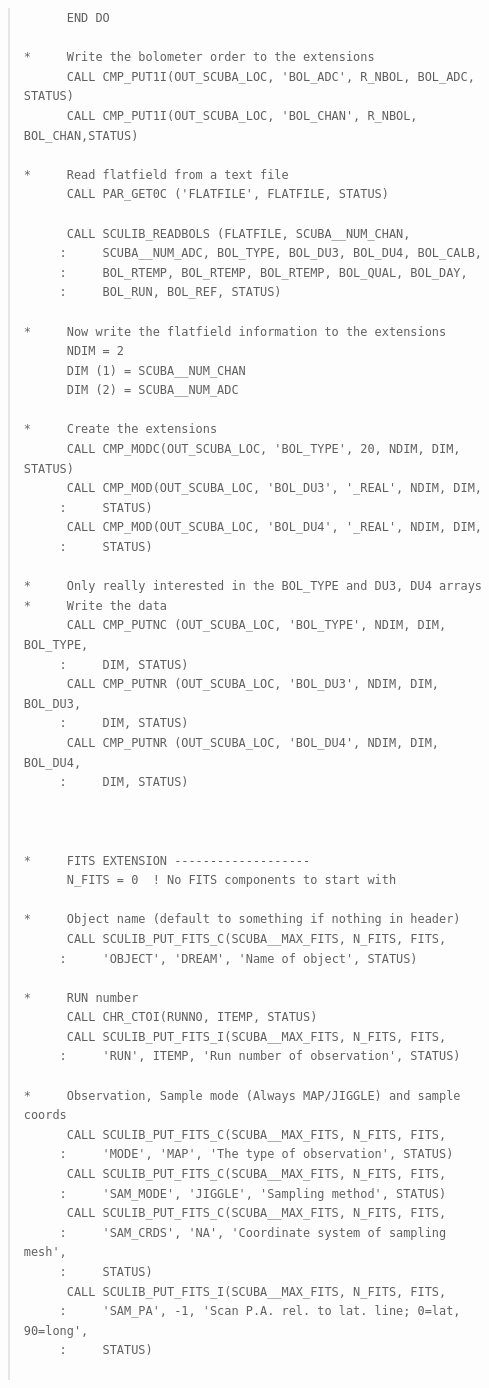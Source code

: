\documentclass[twoside,11pt]{article}
\newenvironment{myquote}{\begin{quote}\begin{small}}{\end{small}\end{quote}}
\renewcommand{\_}{\texttt{\symbol{95}}}
\begin{document}
\begin{myquote}
\begin{verbatim}
      END DO

*     Write the bolometer order to the extensions
      CALL CMP_PUT1I(OUT_SCUBA_LOC, 'BOL_ADC', R_NBOL, BOL_ADC, STATUS)
      CALL CMP_PUT1I(OUT_SCUBA_LOC, 'BOL_CHAN', R_NBOL, BOL_CHAN,STATUS)

*     Read flatfield from a text file
      CALL PAR_GET0C ('FLATFILE', FLATFILE, STATUS)

      CALL SCULIB_READBOLS (FLATFILE, SCUBA__NUM_CHAN,
     :     SCUBA__NUM_ADC, BOL_TYPE, BOL_DU3, BOL_DU4, BOL_CALB,
     :     BOL_RTEMP, BOL_RTEMP, BOL_RTEMP, BOL_QUAL, BOL_DAY,
     :     BOL_RUN, BOL_REF, STATUS)

*     Now write the flatfield information to the extensions
      NDIM = 2
      DIM (1) = SCUBA__NUM_CHAN
      DIM (2) = SCUBA__NUM_ADC

*     Create the extensions
      CALL CMP_MODC(OUT_SCUBA_LOC, 'BOL_TYPE', 20, NDIM, DIM, STATUS)
      CALL CMP_MOD(OUT_SCUBA_LOC, 'BOL_DU3', '_REAL', NDIM, DIM,
     :     STATUS)
      CALL CMP_MOD(OUT_SCUBA_LOC, 'BOL_DU4', '_REAL', NDIM, DIM,
     :     STATUS)

*     Only really interested in the BOL_TYPE and DU3, DU4 arrays
*     Write the data
      CALL CMP_PUTNC (OUT_SCUBA_LOC, 'BOL_TYPE', NDIM, DIM, BOL_TYPE,
     :     DIM, STATUS)
      CALL CMP_PUTNR (OUT_SCUBA_LOC, 'BOL_DU3', NDIM, DIM, BOL_DU3,
     :     DIM, STATUS)
      CALL CMP_PUTNR (OUT_SCUBA_LOC, 'BOL_DU4', NDIM, DIM, BOL_DU4,
     :     DIM, STATUS)



*     FITS EXTENSION -------------------
      N_FITS = 0  ! No FITS components to start with

*     Object name (default to something if nothing in header)
      CALL SCULIB_PUT_FITS_C(SCUBA__MAX_FITS, N_FITS, FITS,
     :     'OBJECT', 'DREAM', 'Name of object', STATUS)

*     RUN number
      CALL CHR_CTOI(RUNNO, ITEMP, STATUS)
      CALL SCULIB_PUT_FITS_I(SCUBA__MAX_FITS, N_FITS, FITS,
     :     'RUN', ITEMP, 'Run number of observation', STATUS)

*     Observation, Sample mode (Always MAP/JIGGLE) and sample coords
      CALL SCULIB_PUT_FITS_C(SCUBA__MAX_FITS, N_FITS, FITS,
     :     'MODE', 'MAP', 'The type of observation', STATUS)
      CALL SCULIB_PUT_FITS_C(SCUBA__MAX_FITS, N_FITS, FITS,
     :     'SAM_MODE', 'JIGGLE', 'Sampling method', STATUS)
      CALL SCULIB_PUT_FITS_C(SCUBA__MAX_FITS, N_FITS, FITS,
     :     'SAM_CRDS', 'NA', 'Coordinate system of sampling mesh',
     :     STATUS)
      CALL SCULIB_PUT_FITS_I(SCUBA__MAX_FITS, N_FITS, FITS,
     :     'SAM_PA', -1, 'Scan P.A. rel. to lat. line; 0=lat, 90=long',
     :     STATUS)


\end{verbatim}
\end{myquote}
\end{document}
